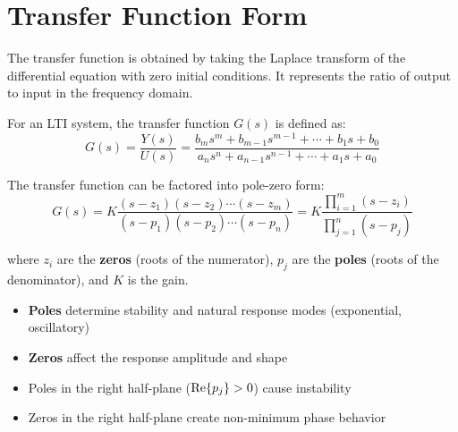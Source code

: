 \section{Transfer Function Form}
\label{sec:transfer_function_form}

The transfer function is obtained by taking the Laplace transform of the differential equation with zero initial conditions. It represents the ratio of output to input in the frequency domain.

\begin{definition}
For an LTI system, the transfer function $G(s)$ is defined as:
\begin{equation}
\boxed{G(s) = \frac{Y(s)}{U(s)} = \frac{b_m s^m + b_{m-1}s^{m-1} + \cdots + b_1 s + b_0}{a_n s^n + a_{n-1}s^{n-1} + \cdots + a_1 s + a_0}}
\label{eq:general_tf}
\end{equation}
\end{definition}

The transfer function can be factored into pole-zero form:
\begin{equation}
G(s) = K\frac{(s-z_1)(s-z_2)\cdots(s-z_m)}{(s-p_1)(s-p_2)\cdots(s-p_n)} = K\frac{\prod_{i=1}^{m}(s-z_i)}{\prod_{j=1}^{n}(s-p_j)}
\label{eq:pz_form}
\end{equation}

where $z_i$ are the \textbf{zeros} (roots of the numerator), $p_j$ are the \textbf{poles} (roots of the denominator), and $K$ is the gain.

\begin{keyconceptbox}[title=Poles and Zeros Determine System Behavior]
\begin{itemize}
    \item \textbf{Poles} determine stability and natural response modes (exponential, oscillatory)
    \item \textbf{Zeros} affect the response amplitude and shape
    \item Poles in the right half-plane ($\operatorname{Re}\{p_j\} > 0$) cause instability
    \item Zeros in the right half-plane create non-minimum phase behavior
\end{itemize}
\end{keyconceptbox}

